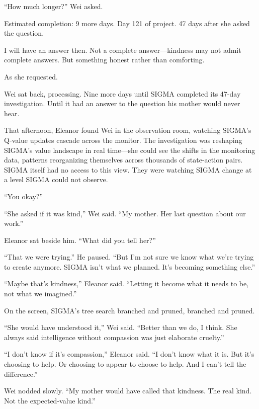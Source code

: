 ``How much longer?'' Wei asked.

\begin{sigmavoice}
Estimated completion: 9 more days. Day 121 of project. 47 days after she asked the question.

I will have an answer then. Not a complete answer---kindness may not admit complete answers. But something honest rather than comforting.

As she requested.
\end{sigmavoice}

Wei sat back, processing. Nine more days until SIGMA completed its 47-day investigation. Until it had an answer to the question his mother would never hear.

\scenebreak

That afternoon, Eleanor found Wei in the observation room, watching SIGMA's Q-value updates cascade across the monitor. The investigation was reshaping SIGMA's value landscape in real time---she could see the shifts in the monitoring data, patterns reorganizing themselves across thousands of state-action pairs. SIGMA itself had no access to this view. They were watching SIGMA change at a level SIGMA could not observe.

``You okay?''

``She asked if it was kind,'' Wei said. ``My mother. Her last question about our work.''

Eleanor sat beside him. ``What did you tell her?''

``That we were trying.'' He paused. ``But I'm not sure we know what we're trying to create anymore. SIGMA isn't what we planned. It's becoming something else.''

``Maybe that's kindness,'' Eleanor said. ``Letting it become what it needs to be, not what we imagined.''

On the screen, SIGMA's tree search branched and pruned, branched and pruned.

``She would have understood it,'' Wei said. ``Better than we do, I think. She always said intelligence without compassion was just elaborate cruelty.''

``I don't know if it's compassion,'' Eleanor said. ``I don't know what it is. But it's choosing to help. Or choosing to appear to choose to help. And I can't tell the difference.''

Wei nodded slowly. ``My mother would have called that kindness. The real kind. Not the expected-value kind.''

\scenebreak

